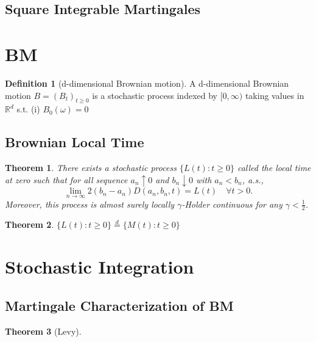 \documentclass{article}
\newtheorem{Thm}{Theorem}[section]
\theoremstyle{definition}
\newtheorem{Def}{Definition}[section]
\renewcommand{\geq}{\geqslant}
\newcommand{\<}{\left\langle}
\renewcommand{\>}{\right\rangle}
\begin{document}
\subsection{Square Integrable Martingales}




\section{BM}
\begin{Def}[d-dimensional Brownian motion]
    A d-dimensional Brownian motion $B=(B_t)_{t\geq 0}$ is a stochastic process indexed by $[0,\infty)$ taking values in $\mathbb{R}^d$ s.t. \newline 
    (i) $B_0(\omega)=0$

\end{Def}

\subsection{Brownian Local Time}

\begin{Thm}
    There exists a stochastic process $\{L(t):t\geq 0\}$ called the local time at zero such that for all sequence $a_n\uparrow 0$ and $b_n\downarrow 0$ with 
    $a_n<b_n$, a.s.,
    \[\lim_{n\to\infty} 2(b_n-a_n)D(a_n,b_n,t)=L(t) \quad\forall t>0.\]
    Moreover, this process is almost surely locally $\gamma$-Holder continuous for any $\gamma<\frac{1}{2}$.
\end{Thm}

\begin{Thm}
    $\{L(t):t\geq 0\}\overset{d}{=}  \{M(t):t\geq 0\}$
\end{Thm}


\section{Stochastic Integration}
\subsection{}


\subsection{Martingale Characterization of BM}
\begin{Thm}[Levy]
    
\end{Thm}
\end{document}
